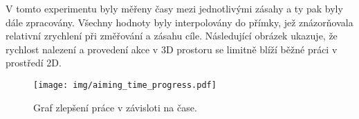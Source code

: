V tomto experimentu byly měřeny časy mezi jednotlivými zásahy a ty pak byly dále zpracovány. Všechny hodnoty byly interpolovány do přímky, jež znázorňovala relativní zrychlení při změřování a zásahu cíle. Následující obrázek ukazuje, že rychlost nalezení a provedení akce v 3D prostoru se limitně blíží běžné práci v prostředí 2D.

\begin{figure}[htb]
\centering
\texttt{[image: img/aiming\_time\_progress.pdf]}
\caption{Graf zlepšení práce v závisloti na čase.}
\label{fig:basicidea}
\end{figure}

